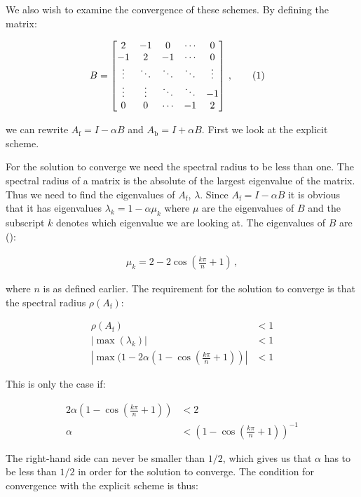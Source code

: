 \documentclass[reprint,english,notitlepage]{revtex4-1}  %
\newcommand\numberthis{\addtocounter{equation}{1}\tag{\theequation}}
\begin{document}
We also wish to examine the convergence of these schemes. By defining the matrix:

\begin{align*}
B &= \begin{bmatrix}
2 & -1 & 0 & \cdots & 0 \\
-1 & 2 & -1 &  \cdots & 0 \\
\vdots & \ddots & \ddots & \ddots & \vdots \\
\vdots & \vdots & \ddots & \ddots & -1 \\
0 & 0 & \cdots & -1 & 2 
\end{bmatrix} \, , \numberthis \label{eq:matrix_B}
\end{align*}

we can rewrite $A_\text{f} = I - \alpha B$ and $A_\text{b} = I + \alpha B$. First we look at the explicit scheme.

For the solution to converge we need the spectral radius to be less than one. The spectral radius of a matrix is the absolute of the largest eigenvalue of the matrix. Thus we need to find the eigenvalues of $A_\text{f}$, $\lambda$. Since $A_\text{f} = I - \alpha B$ it is obvious that it has eigenvalues $\lambda_{k} = 1 - \alpha \mu_k$ where $\mu$ are the eigenvalues of $B$ and the subscript $k$ denotes which eigenvalue we are looking at. The eigenvalues of $B$ are (\cite[p.~307]{Hjorth-Jensen2015}):

\begin{align*}
\mu_k = 2 - 2\cos(\frac{k\pi}{n} + 1) \, , 
\end{align*}

where $n$ is as defined earlier. The requirement for the solution to converge is that the spectral radius $\rho(A_\text{f})$:

\begin{align*}
\rho(A_\text{f}) &< 1 \\
|\max (\lambda_k) | &< 1 \\
|\max ( 1 - 2\alpha(1 - \cos (\frac{k\pi}{n} + 1) ) | &< 1
\end{align*}

This is only the case if:

\begin{align*}
2\alpha ( 1 - \cos( \frac{k\pi}{n} + 1) ) &< 2 \\
\alpha &< ( 1 - \cos( \frac{k\pi}{n} + 1) )^{-1} 
\end{align*}

The right-hand side can never be smaller than $1/2$, which gives us that $\alpha$ has to be less than $1/2$ in order for the solution to converge. The condition for convergence with the explicit scheme is thus:
\end{document}
